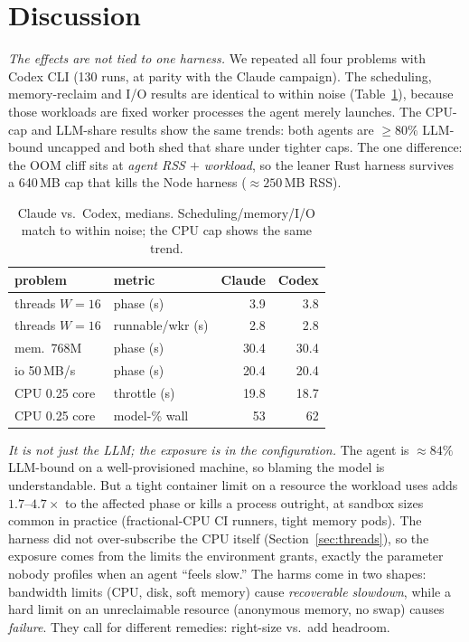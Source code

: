 \documentclass[10pt,twocolumn]{article}
\newcommand{\uu}[1]{\,\textsf{#1}}
\begin{document}
\section{Discussion}
\label{sec:consistency}

\emph{The effects are not tied to one harness.} We repeated all four
problems with Codex CLI (130 runs, at parity with the Claude campaign). The
scheduling, memory-reclaim and I/O results are identical to within noise
(Table~\ref{tab:consistency}), because those workloads are fixed worker
processes the agent merely launches. The CPU-cap and LLM-share results show
the same trends: both agents are ${\ge}80\%$ LLM-bound uncapped and both
shed that share under tighter caps. The one difference: the OOM cliff sits
at \emph{agent RSS $+$ workload}, so the leaner Rust harness survives a
640\,MB cap that kills the Node harness (${\approx}250$\,MB RSS).

\begin{table}[t]\centering\footnotesize
\setlength{\tabcolsep}{4pt}
\caption{Claude vs.\ Codex, medians. Scheduling/memory/I/O match to within
noise; the CPU cap shows the same trend.}
\label{tab:consistency}
\begin{tabular}{@{}llrr@{}}
\toprule
problem & metric & Claude & Codex\\
\midrule
threads $W{=}16$ & phase (s)        & 3.9 & 3.8 \\
threads $W{=}16$ & runnable/wkr (s) & 2.8 & 2.8 \\
mem.\ 768M       & phase (s)        & 30.4 & 30.4 \\
io 50\uu{MB/s}   & phase (s)        & 20.4 & 20.4 \\
CPU 0.25 core    & throttle (s)     & 19.8 & 18.7 \\
CPU 0.25 core    & model-\% wall    & 53 & 62 \\
\bottomrule
\end{tabular}
\end{table}

\emph{It is not just the LLM; the exposure is in the configuration.} The
agent is ${\approx}84\%$ LLM-bound on a well-provisioned machine, so blaming
the model is understandable. But a tight container limit on a resource the
workload uses adds $1.7$--$4.7\times$ to the affected phase or kills a
process outright, at sandbox sizes common in practice (fractional-CPU CI
runners, tight memory pods). The harness did not over-subscribe the CPU itself
(Section~\ref{sec:threads}), so the exposure comes from the limits the
environment grants, exactly the parameter nobody profiles when an agent
``feels slow.'' The harms come in two shapes: bandwidth limits (CPU,
disk, soft memory) cause \emph{recoverable slowdown}, while a hard limit on
an unreclaimable resource (anonymous memory, no swap) causes \emph{failure}.
They call for different remedies: right-size vs.\ add headroom.
\end{document}
